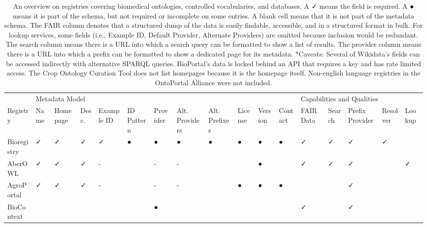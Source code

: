 \begin{table}
\centering
\caption{An overview on registries covering biomedical ontologies, controlled vocabularies, and databases. A ✓ means the field is required. A ● means it is part of the schema, but not required or incomplete on some entries. A blank cell means that it is not part of the metadata schema. The FAIR column denotes that a structured dump of the data is easily findable, accessible, and in a structured format in bulk. For lookup services, some fields (i.e., Example ID, Default Provider, Alternate Providers) are omitted because inclusion would be redundant. The search column means there is a URL into which a search query can be formatted to show a list of results. The provider column means there is a URL into which a prefix can be formatted to show a dedicated page for its metadata. *Caveats: Several of Wikidata's fields can be accessed indirectly with alternative SPARQL queries. BioPortal's data is locked behind an API that requires a key and has rate limited access. The Crop Ontology Curation Tool does not list homepages because it is the homepage itself. Non-english language registries in the OntoPortal Alliance were not included.}
\label{tab:registry-comparison-governance}
\begin{tabular}{lllllllllllllllll}
\toprule
                & \multicolumn{11}{l}{Metadata Model} & \multicolumn{5}{l}{Capabilities and Qualities} \\
       Registry &           Name & Homepage & Desc. & Example ID & ID Pattern & Provider & Alt. Providers & Alt. Prefixes & License & Version & Contact &                  FAIR Data & Search & Prefix Provider & Resolver & Lookup \\
\midrule
    Bioregistry &              ✓ &        ✓ &     ✓ &          ✓ &          ● &        ● &              ● &             ● &       ● &       ● &       ● &                          ✓ &      ✓ &               ✓ &        ✓ &        \\
        AberOWL &              ✓ &        ✓ &     ✓ &          - &            &        - &              - &               &         &       ● &         &                          ✓ &      ✓ &               ✓ &          &      ✓ \\
     AgroPortal &              ✓ &        ✓ &     ✓ &          - &            &        - &              - &               &       ● &       ● &       ● &                            &        &               ✓ &          &        \\
     BioContext &                &          &       &            &            &        ● &                &               &         &         &         &                          ✓ &        &               ✓ &          &        \\

\end{tabular}
\end{table}
